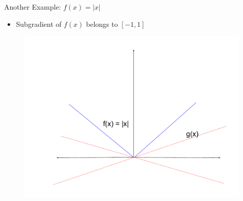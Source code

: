 \documentclass{beamer}
\begin{document}
\begin{frame}{Another Example: $f(x) = |x|$}

\begin{itemize}
\item Subgradient of $f(x)$ belongs to $[-1, 1]$
\end{itemize}
\begin{figure}
    \centering
    \includegraphics[scale = 0.25]{subgradient_3.pdf}
    \label{fig:my_label}
\end{figure}
\end{frame}
\end{document}
